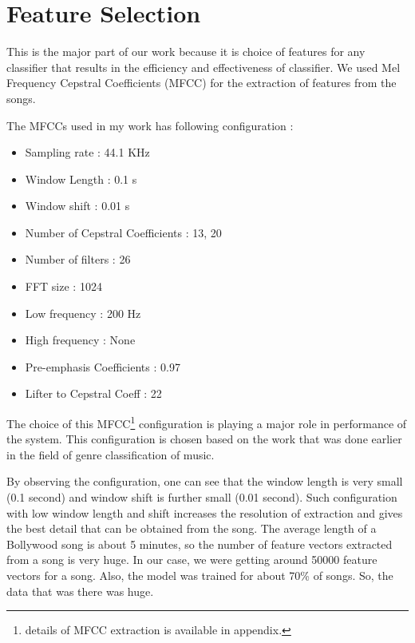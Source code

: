 \section{Feature Selection}
\label{sec:fsgc}
This is the major part of our work because it is choice of features for any classifier that results in the efficiency and effectiveness of classifier. We used Mel Frequency Cepstral Coefficients (MFCC) for the extraction of features from the songs. \par
The MFCCs used in my work has following configuration :
\begin{itemize} 
\item Sampling rate : 44.1 KHz
\item Window Length : 0.1 s
\item Window shift : 0.01 s
\item Number of Cepstral Coefficients : 13, 20
\item Number of filters : 26
\item FFT size : 1024
\item Low frequency : 200 Hz
\item High frequency : None
\item Pre-emphasis Coefficients : 0.97
\item Lifter to Cepstral Coeff : 22
\end{itemize}
The choice of this MFCC\footnote{details of MFCC extraction is available in appendix.} configuration is playing a major role in performance of the system. This configuration is chosen based on the work that was done earlier in the field of genre classification of music.\par
By observing the configuration, one can see that the window length is very small (0.1 second) and window shift is further small (0.01 second). Such configuration with low window length and shift increases the resolution of extraction and gives the best detail that can be obtained from the song. The average length of a Bollywood song is about 5 minutes, so the number of feature vectors extracted from a song is very huge. In our case, we were getting around 50000 feature vectors for a song. Also, the model was trained for about 70\% of songs. So, the data that was there was huge.

